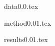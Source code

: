 \documentclass[useAMS,usenatbib]{mn2e}
\begin{document}
{data0.0.tex}


{method0.01.tex}

{results0.01.tex}


\end{document}
